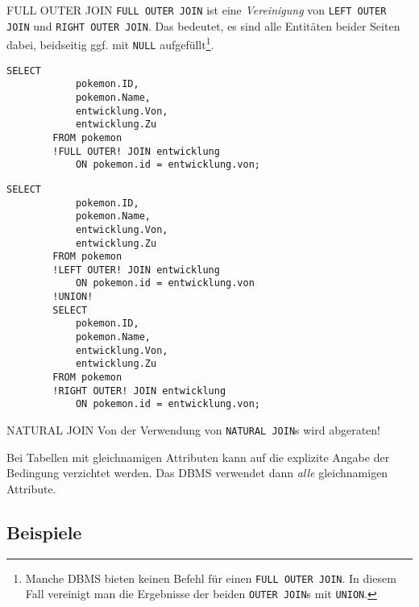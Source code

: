 \begin{sql}{FULL OUTER JOIN}
    \texttt{FULL OUTER JOIN} ist eine \emph{Vereinigung} von \texttt{LEFT OUTER JOIN} und \texttt{RIGHT OUTER JOIN}.
    Das bedeutet, es sind alle Entitäten beider Seiten dabei, beidseitig ggf. mit \texttt{NULL} aufgefüllt\footnote{
    Manche DBMS bieten keinen Befehl für einen \texttt{FULL OUTER JOIN}.
    In diesem Fall vereinigt man die Ergebnisse der beiden \texttt{OUTER JOIN}s mit \texttt{UNION}.}.

    \begin{lstlisting}[language=mysql]
        SELECT
            pokemon.ID,
            pokemon.Name,
            entwicklung.Von,
            entwicklung.Zu
        FROM pokemon
        !FULL OUTER! JOIN entwicklung
            ON pokemon.id = entwicklung.von;
    \end{lstlisting}

    \begin{lstlisting}[language=mysql]
        SELECT
            pokemon.ID,
            pokemon.Name,
            entwicklung.Von,
            entwicklung.Zu
        FROM pokemon
        !LEFT OUTER! JOIN entwicklung
            ON pokemon.id = entwicklung.von
        !UNION!
        SELECT
            pokemon.ID,
            pokemon.Name,
            entwicklung.Von,
            entwicklung.Zu
        FROM pokemon
        !RIGHT OUTER! JOIN entwicklung
            ON pokemon.id = entwicklung.von;
    \end{lstlisting}
\end{sql}

\begin{bonus}{NATURAL JOIN}
    Von der Verwendung von \texttt{NATURAL JOIN}s wird abgeraten!

    Bei Tabellen mit gleichnamigen Attributen kann auf die explizite Angabe der Bedingung verzichtet werden.
    Das DBMS verwendet dann \emph{alle} gleichnamigen Attribute.
\end{bonus}

\subsection{Beispiele}

